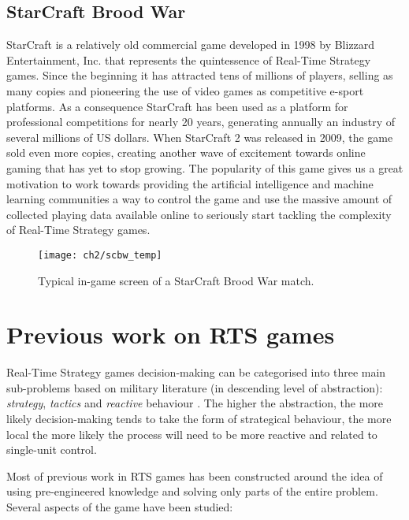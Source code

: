 \subsection{StarCraft Brood War}

StarCraft is a relatively old commercial game developed in 1998 by Blizzard
Entertainment, Inc. that represents the quintessence of Real-Time Strategy
games. Since the beginning it has attracted tens of millions of players, selling
as many copies and pioneering the use of video games as competitive e-sport
platforms. As a consequence StarCraft has been used as a platform for
professional competitions for nearly 20 years, generating annually an industry
of several millions of US dollars. When StarCraft 2 was released in 2009, the
game sold even more copies, creating another wave of excitement towards online
gaming that has yet to stop growing. The popularity of this game gives us a
great motivation to work towards providing the artificial intelligence and
machine learning communities a way to control the game and use the massive
amount of collected playing data available online to seriously start tackling
the complexity of Real-Time Strategy games.

\begin{figure}[h]
    \centering
    \texttt{[image: ch2/scbw\_temp]}
    \caption{Typical in-game screen of a StarCraft Brood War match.}
    \label{fig:ALE}
\end{figure}

\section{Previous work on RTS games}

Real-Time Strategy games decision-making can be categorised into three main
sub-problems based on military literature (in descending level of abstraction):
\emph{strategy}, \emph{tactics} and \emph{reactive} behaviour
\citep{handel2005masters}. The higher the abstraction, the more likely
decision-making tends to take the form of strategical behaviour, the more local
the more likely the process will need to be more reactive and related to
single-unit control.

Most of previous work in RTS games has been constructed around the idea of using
pre-engineered knowledge and solving only parts of the entire problem. Several
aspects of the game have been studied:

